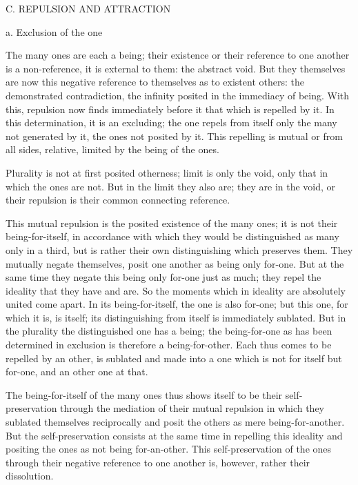 C. REPULSION AND ATTRACTION

a. Exclusion of the one

The many ones are each a being;
their existence or their reference to one another
is a non-reference, it is external to them:
the abstract void.
But they themselves are now this negative reference
to themselves as to existent others:
the demonstrated contradiction, the infinity posited
in the immediacy of being.
With this, repulsion now finds immediately before it
that which is repelled by it.
In this determination, it is an excluding;
the one repels from itself only the many not generated by it,
the ones not posited by it.
This repelling is mutual or from all sides, relative,
limited by the being of the ones.

Plurality is not at first posited otherness;
limit is only the void, only that in which the ones are not.
But in the limit they also are;
they are in the void,
or their repulsion is their
common connecting reference.

This mutual repulsion is the posited
existence of the many ones;
it is not their being-for-itself,
in accordance with which they would be
distinguished as many only in a third,
but is rather their own distinguishing
which preserves them.
They mutually negate themselves,
posit one another as being only for-one.
But at the same time they negate this
being only for-one just as much;
they repel the ideality that they have and are.
So the moments which in ideality are
absolutely united come apart.
In its being-for-itself, the one is also for-one;
but this one, for which it is, is itself;
its distinguishing from itself is immediately sublated.
But in the plurality the distinguished one has a being;
the being-for-one as has been determined in exclusion
is therefore a being-for-other.
Each thus comes to be repelled by an other,
is sublated and made into a one which is not for itself
but for-one, and an other one at that.

The being-for-itself of the many ones
thus shows itself to be their self-preservation
through the mediation of their mutual repulsion
in which they sublated themselves reciprocally
and posit the others as mere being-for-another.
But the self-preservation consists at the same time
in repelling this ideality and positing the ones
as not being for-an-other.
This self-preservation of the ones
through their negative reference to one another is,
however, rather their dissolution.

